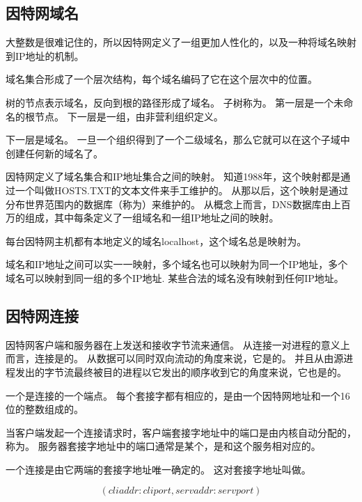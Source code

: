 {    \subsection{因特网域名}
    {
        大整数是很难记住的，所以因特网定义了一组更加人性化的，以及一种将域名映射到IP地址的机制。

        域名集合形成了一个层次结构，每个域名编码了它在这个层次中的位置。

        树的节点表示域名，反向到根的路径形成了域名。
        子树称为。
        第一层是一个未命名的根节点。
        下一层是一组，由非营利组织定义。

        下一层是域名。
        一旦一个组织得到了一个二级域名，那么它就可以在这个子域中创建任何新的域名了。

        因特网定义了域名集合和IP地址集合之间的映射。
        知道1988年，这个映射都是通过一个叫做HOSTS.TXT的文本文件来手工维护的。
        从那以后，这个映射是通过分布世界范围内的数据库（称为）来维护的。
        从概念上而言，DNS数据库由上百万的组成，其中每条定义了一组域名和一组IP地址之间的映射。

        每台因特网主机都有本地定义的域名localhost，这个域名总是映射为。

        域名和IP地址之间可以实一一映射，多个域名也可以映射为同一个IP地址，多个域名可以映射到同一组的多个IP地址.
        某些合法的域名没有映射到任何IP地址。
    }

    \subsection{因特网连接}
    {
        因特网客户端和服务器在上发送和接收字节流来通信。
        从连接一对进程的意义上而言，连接是的。
        从数据可以同时双向流动的角度来说，它是的。
        并且从由源进程发出的字节流最终被目的进程以它发出的顺序收到它的角度来说，它也是的。

        一个是连接的一个端点。
        每个套接字都有相应的，是由一个因特网地址和一个16位的整数组成的。

        当客户端发起一个连接请求时，客户端套接字地址中的端口是由内核自动分配的，称为。
        服务器套接字地址中的端口通常是某个，是和这个服务相对应的。

        一个连接是由它两端的套接字地址唯一确定的。
        这对套接字地址叫做。

        $$(cliaddr:cliport, servaddr:servport)$$
    }
}

